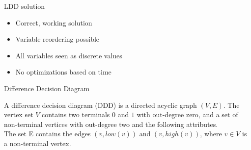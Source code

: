 \begin{frame}{LDD solution}
\begin{itemize}
	\item Correct, working solution
	\item Variable reordering possible
	\item All variables seen as discrete values
	\item No optimizations based on time
\end{itemize}
\end{frame}

\begin{frame}{Difference Decision Diagram}
\begin{mydef}
A difference decision diagram (DDD) is a directed acyclic graph $(V,E)$. The vertex set $V$ contains two terminals $0$ and $1$ with out-degree zero, and a set of non-terminal vertices with out-degree two and the following attributes.
\\
The set E contains the edges $(v,low(v))$ and $(v, high(v))$, where $v \in V$ is a non-terminal vertex.
\end{mydef}
\end{frame}

